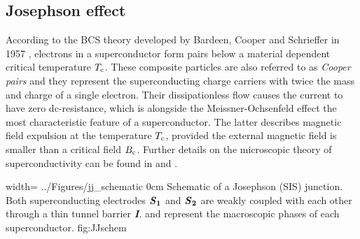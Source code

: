 \subsection{Josephson effect}\label{subchap_Jeffect}

According to the BCS theory developed by Bardeen, Cooper and Schrieffer in 1957 \cite{Bardeen1957}, electrons in a superconductor form pairs below a material dependent critical temperature $T_{\rm c}$. These composite particles are also referred to as \textit{Cooper pairs} and they represent the superconducting charge carriers with twice the mass and charge of a single electron. Their dissipationless flow causes the current to have zero dc-resistance, which is alongside the Meissner-Ochsenfeld effect \cite{Meissner1933} the most characteristic feature of a superconductor. The latter describes magnetic field expulsion at the temperature $T_{\rm c}$, provided the external magnetic field is smaller than a critical field $B_{\rm c}$. Further details on the microscopic theory of superconductivity can be found in \cite{Bardeen1957} and \cite{Ginzburg1950}.

{width=\textwidth}
{../Figures/jj_schematic}
{0cm}
{Schematic of a Josephson (SIS) junction. Both superconducting electrodes $\textbf{\textit{S}}_\textbf{1}$ and $\textbf{\textit{S}}_\textbf{2}$ are weakly coupled with each other through a thin tunnel barrier \textbf{\textit{I}}.  and  represent the macroscopic phases of each superconductor.} 
{fig:JJschem}

